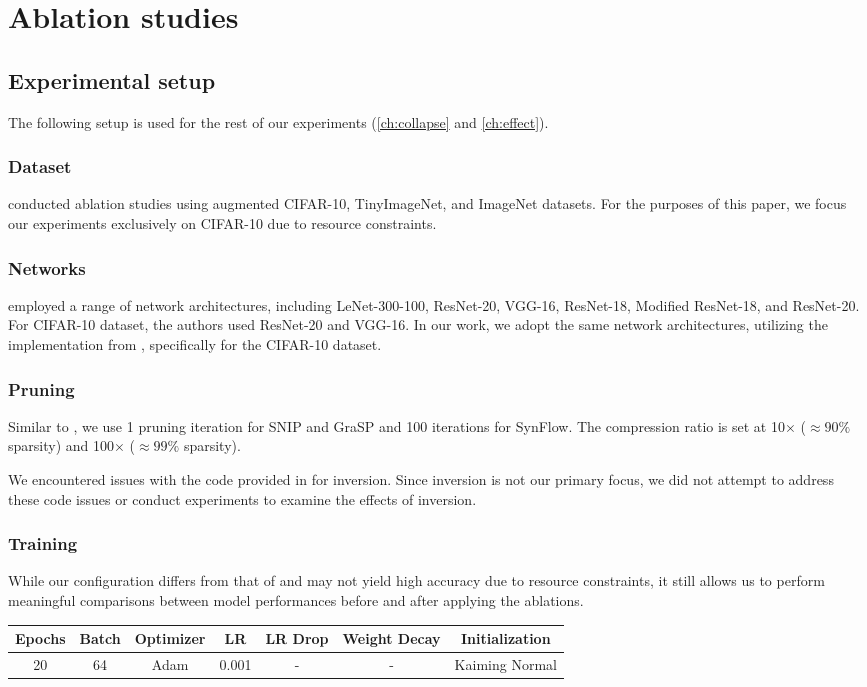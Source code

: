 \chapter{Ablation studies}
\label{ch:ablation}
\vspace{1em}

\section{Experimental setup}
The following setup is used for the rest of our experiments (\autoref{ch:collapse} and \autoref{ch:effect}).
\subsection{Dataset}
\textcite{frankle21} conducted ablation studies using augmented CIFAR-10, TinyImageNet, and ImageNet datasets. For the purposes of this paper, we focus our experiments exclusively on CIFAR-10 due to resource constraints.

\subsection{Networks}
\textcite{frankle21} employed a range of network architectures, including LeNet-300-100, ResNet-20, VGG-16, ResNet-18, Modified ResNet-18, and ResNet-20. For CIFAR-10 dataset, the authors used ResNet-20 and VGG-16. In our work, we adopt the same network architectures, utilizing the implementation from \textcite{synflow20}, specifically for the CIFAR-10 dataset.

\subsection{Pruning}
Similar to \textcite{frankle21}, we use 1 pruning iteration for SNIP and GraSP and 100 iterations for SynFlow. The compression ratio is set at 10$\times$ ($\approx 90\%$ sparsity) and 100$\times$ ($\approx 99\%$ sparsity).

We encountered issues with the code provided in \textcite{synflow20} for inversion. Since inversion is not our primary focus, we did not attempt to address these code issues or conduct experiments to examine the effects of inversion.

\subsection{Training}
While our configuration differs from that of \textcite{frankle21} and may not yield high accuracy due to resource constraints, it still allows us to perform meaningful comparisons between model performances before and after applying the ablations.
\begin{table}[h!]
\begin{tabular}{|ccccccc|}
\hline
Epochs & Batch & Optimizer & LR    & LR Drop & Weight Decay & Initialization \\ \hline
20     & 64    & Adam      & 0.001 & -       & -            & Kaiming Normal \\ \hline
\end{tabular}
\end{table}

